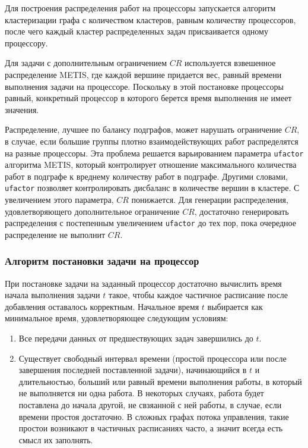 Для построения распределения работ на процессоры запускается алгоритм кластеризации графа с количеством кластеров, равным количеству процессоров, после чего каждый кластер распределенных задач присваивается одному процессору.

Для задачи с дополнительным ограничением $CR$ используется взвешенное распределение METIS, где каждой вершине придается вес, равный времени выполнения задачи на процессоре. Поскольку в этой постановке процессоры равный, конкретный процессор в которого берется время выполнения не имеет значения.

Распределение, лучшее по балансу подграфов, может нарушать ограничение $CR$, в случае, если большие группы плотно взаимодействующих работ распределятся на разные процессоры. Эта проблема решается варьированием параметра \texttt{ufactor} алгоритма METIS, который контролирует отношение максимального количества работ в подграфе к вреднему количеству работ в подграфе. Другими словами, \texttt{ufactor} позволяет контролировать дисбаланс в количестве вершин в кластере. С увеличением этого параметра, $CR$ понижается. Для генерации распределения, удовлетворяющего дополнительное ограничение $CR$, достаточно генерировать распределения с постепенным увеличением \texttt{ufactor} до тех пор, пока очередное распределение не выполнит $CR$.

\subsubsection{Алгоритм постановки задачи на процессор} \label{gap_filling}
При постановке задачи на заданный процессор достаточно вычислить время начала выполнения задачи $t$ такое, чтобы каждое частичное расписание после добавления оставалось корректным. Начальное время $t$ выбирается как минимальное время, удовлетворяющее следующим условиям:
\begin{enumerate}
    \item Все передачи данных от предшествующих задач завершились до $t$.
    \item Существует свободный интервал времени (простой процессора или после завершения последней поставленной задачи), начинающийся в $t$ и длительностью, больший или равный времени выполнения работы, в который не выполняется ни одна работа. В некоторых случаях, работа будет поставлена до начала другой, не свзяанной с ней работы, в случае, если времени простоя достаточно. В сложных графах потока управления, такие простои возникают в частичных расписаниях часто, а значит всегда есть смысл их заполнять.
\end{enumerate}

